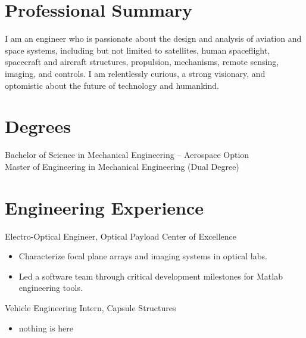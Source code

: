 \documentclass[10pt,final,sans]{resume}
\begin{document}
\setlength\headheight{28pt} %

\section{Professional Summary}
I am an engineer who is passionate about the design and analysis of
aviation and space systems, including but not limited to satellites, human
spaceflight, spacecraft and aircraft structures, propulsion, mechanisms, remote sensing, 
imaging, and controls. I am relentlessly curious, a strong visionary, and
optomistic about the future of technology and humankind.

\section{Degrees}
Bachelor of Science in Mechanical Engineering -- Aerospace Option \\
Master of Engineering in Mechanical Engineering (Dual Degree) 

\section{Engineering Experience}
Electro-Optical Engineer, Optical Payload Center of Excellence
\begin{itemize}
  \item Characterize focal plane arrays and imaging systems in optical labs.
  \item Led a software team through critical development milestones for Matlab engineering tools. 
\end{itemize} 
Vehicle Engineering Intern, Capsule Structures
\begin{itemize}
  \item nothing is here
\end{itemize}
\end{document}
